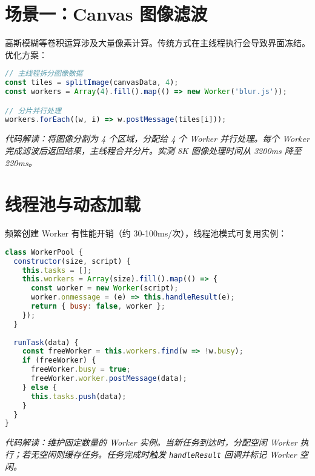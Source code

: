 \section{场景一：Canvas 图像滤波}
高斯模糊等卷积运算涉及大量像素计算。传统方式在主线程执行会导致界面冻结。优化方案：\par
\begin{lstlisting}[language=javascript]
// 主线程拆分图像数据
const tiles = splitImage(canvasData, 4); 
const workers = Array(4).fill().map(() => new Worker('blur.js'));

// 分片并行处理
workers.forEach((w, i) => w.postMessage(tiles[i])); 
\end{lstlisting}
\textit{代码解读：将图像分割为 4 个区域，分配给 4 个 Worker 并行处理。每个 Worker 完成滤波后返回结果，主线程合并分片。实测 8K 图像处理时间从 3200ms 降至 220ms。}\par
\section{线程池与动态加载}
频繁创建 Worker 有性能开销（约 30-100ms/次），线程池模式可复用实例：\par
\begin{lstlisting}[language=javascript]
class WorkerPool {
  constructor(size, script) {
    this.tasks = [];
    this.workers = Array(size).fill().map(() => {
      const worker = new Worker(script);
      worker.onmessage = (e) => this.handleResult(e);
      return { busy: false, worker };
    });
  }
  
  runTask(data) {
    const freeWorker = this.workers.find(w => !w.busy);
    if (freeWorker) {
      freeWorker.busy = true;
      freeWorker.worker.postMessage(data);
    } else {
      this.tasks.push(data);
    }
  }
}
\end{lstlisting}
\textit{代码解读：维护固定数量的 Worker 实例。当新任务到达时，分配空闲 Worker 执行；若无空闲则缓存任务。任务完成时触发 \texttt{handleResult} 回调并标记 Worker 空闲。}\par
